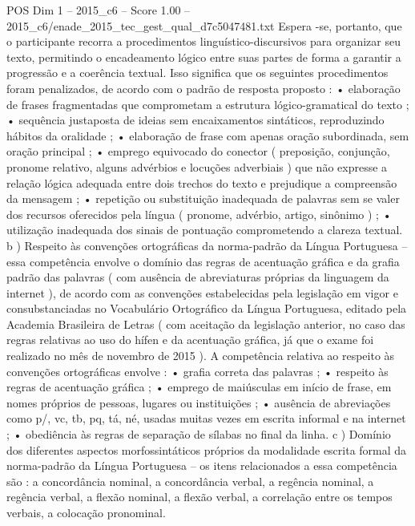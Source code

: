 \begin{textsample}{POS Dim 1 – 2015\_c6 – Score 1.00 – 2015\_c6/enade\_2015\_tec\_gest\_qual\_d7c5047481.txt}
Espera -se, portanto, que o participante recorra a procedimentos linguístico-discursivos para organizar seu texto, permitindo o encadeamento lógico entre suas partes de forma a garantir a progressão e a coerência textual.
Isso significa que os seguintes procedimentos foram penalizados, de acordo com o padrão de resposta proposto : • elaboração de frases fragmentadas que comprometam a estrutura lógico-gramatical do texto ; • sequência justaposta de ideias sem encaixamentos sintáticos, reproduzindo hábitos da oralidade ; • elaboração de frase com apenas oração subordinada, sem oração principal ; • emprego equivocado do conector ( preposição, conjunção, pronome relativo, alguns advérbios e locuções adverbiais ) que não expresse a relação lógica adequada entre dois trechos do texto e prejudique a compreensão da mensagem ; • repetição ou substituição inadequada de palavras sem se valer dos recursos oferecidos pela língua ( pronome, advérbio, artigo, sinônimo ) ; • utilização inadequada dos sinais de pontuação comprometendo a clareza textual. b ) Respeito às convenções ortográficas da norma-padrão da Língua Portuguesa – essa competência envolve o domínio das regras de acentuação gráfica e da grafia padrão das palavras ( com ausência de abreviaturas próprias da linguagem da internet ), de acordo com as convenções estabelecidas pela legislação em vigor e consubstanciadas no Vocabulário Ortográfico da Língua Portuguesa, editado pela Academia Brasileira de Letras ( com aceitação da legislação anterior, no caso das regras relativas ao uso do hífen e da acentuação gráfica, já que o exame foi realizado no mês de novembro de 2015 ).
A competência relativa ao respeito às convenções ortográficas envolve : • grafia correta das palavras ; • respeito às regras de acentuação gráfica ; • emprego de maiúsculas em início de frase, em nomes próprios de pessoas, lugares ou instituições ; • ausência de abreviações como p/, vc, tb, pq, tá, né, usadas muitas vezes em escrita informal e na internet ; • obediência às regras de separação de sílabas no final da linha. c ) Domínio dos diferentes aspectos morfossintáticos próprios da modalidade escrita formal da norma-padrão da Língua Portuguesa – os itens relacionados a essa competência são : a concordância nominal, a concordância verbal, a regência nominal, a regência verbal, a flexão nominal, a flexão verbal, a correlação entre os tempos verbais, a colocação pronominal.

\end{textsample}
